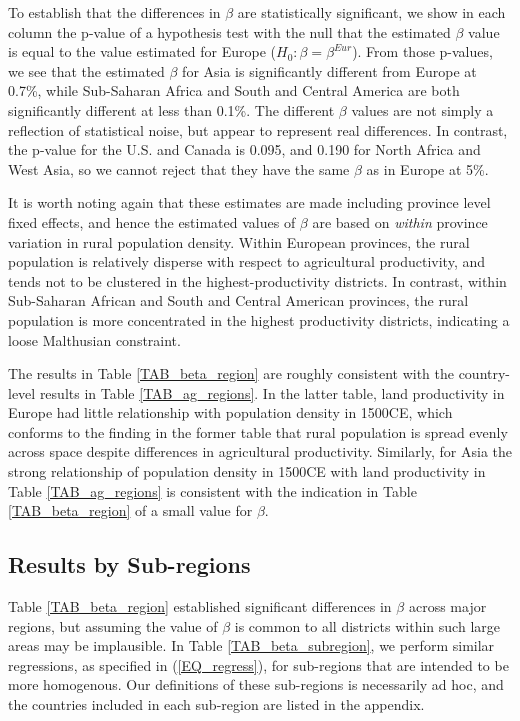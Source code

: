 \documentclass[11pt]{article}
\begin{document}
To establish that the differences in $\beta$ are statistically significant, we show in each column the p-value of a hypothesis test with the null that the estimated $\beta$ value is equal to the value estimated for Europe ($H_0: \beta = \beta^{Eur}$). From those p-values, we see that the estimated $\beta$ for Asia is significantly different from Europe at 0.7\%, while Sub-Saharan Africa and South and Central America are both significantly different at less than 0.1\%. The different $\beta$ values are not simply a reflection of statistical noise, but appear to represent real differences. In contrast, the p-value for the U.S. and Canada is 0.095, and 0.190 for North Africa and West Asia, so we cannot reject that they have the same $\beta$ as in Europe at 5\%.

It is worth noting again that these estimates are made including province level fixed effects, and hence the estimated values of $\beta$ are based on \textit{within} province variation in rural population density. Within European provinces, the rural population is relatively disperse with respect to agricultural productivity, and tends not to be clustered in the highest-productivity districts. In contrast, within Sub-Saharan African and South and Central American provinces, the rural population is more concentrated in the highest productivity districts, indicating a loose Malthusian constraint.

The results in Table \ref{TAB_beta_region} are roughly consistent with the country-level results in Table \ref{TAB_ag_regions}. In the latter table, land productivity in Europe had little relationship with population density in 1500CE, which conforms to the finding in the former table that rural population is spread evenly across space despite differences in agricultural productivity. Similarly, for Asia the strong relationship of population density in 1500CE with land productivity in Table \ref{TAB_ag_regions} is consistent with the indication in Table \ref{TAB_beta_region} of a small value for $\beta$.

\subsection{Results by Sub-regions}
Table \ref{TAB_beta_region} established significant differences in $\beta$ across major regions, but assuming the value of $\beta$ is common to all districts within such large areas may be implausible. In Table \ref{TAB_beta_subregion}, we perform similar regressions, as specified in (\ref{EQ_regress}), for sub-regions that are intended to be more homogenous. Our definitions of these sub-regions is necessarily ad hoc, and the countries included in each sub-region are listed in the appendix.
\end{document}
